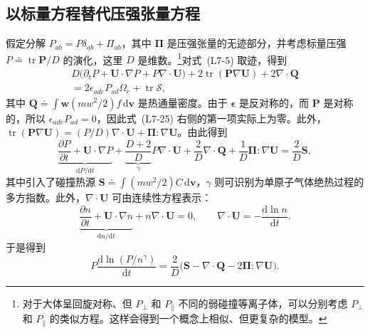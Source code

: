 \subsection{以标量方程替代压强张量方程}
假定分解 $P_{ab}=P\delta_{ab}+\Pi_{ab}$，其中 $\boldsymbol\Pi$ 是压强张量的无迹部分，并考虑标量压强 $P\doteq\operatorname{tr}\boldsymbol P/D$ 的演化，这里 $D$ 是维数。\footnote{对于大体呈回旋对称、但 $P_\perp$ 和 $P_\parallel$ 不同的弱碰撞等离子体，可以分别考虑 $P_\perp$ 和 $P_\parallel$ 的类似方程。这样会得到一个概念上相似、但更复杂的模型。}对式~(L7-5) 取迹，得到
\begin{equation}
\begin{aligned}
D\bigl(\partial_tP+\boldsymbol U\cdot\nabla P+P\nabla\cdot\boldsymbol U\bigr)
+2\operatorname{tr}(\boldsymbol P\nabla\boldsymbol U)+2\nabla\cdot\boldsymbol Q
\\{}=2\epsilon_{ade}P_{ad}\Omega_e+\operatorname{tr}\boldsymbol{\mathcal S},
\end{aligned}
\tag{L7-25}\label{eq:L7:25}
\end{equation}
其中 $\boldsymbol Q\doteq\int\boldsymbol w(mw^2/2)f\,\mathrm d\boldsymbol v$ 是热通量密度。由于 $\boldsymbol\epsilon$ 是反对称的，而 $\boldsymbol P$ 是对称的，所以 $\epsilon_{ade}P_{ad}=0$，因此式~(L7-25) 右侧的第一项实际上为零。此外，$\operatorname{tr}(\boldsymbol P\nabla\boldsymbol U)=(P/D)\nabla\cdot\boldsymbol U+\boldsymbol\Pi:\nabla\boldsymbol U$。由此得到
\begin{equation}
\underbrace{\frac{\partial P}{\partial t}+\boldsymbol U\cdot\nabla P}_{\mathrm dP/\mathrm dt}
+\underbrace{\frac{D+2}{D}}_{\gamma}P\nabla\cdot\boldsymbol U
+\frac2D\nabla\cdot\boldsymbol Q+\frac1D\boldsymbol\Pi:\nabla\boldsymbol U
=\frac2D\boldsymbol S,
\tag{L7-26}\label{eq:L7:26}
\end{equation}
其中引入了碰撞热源 $\boldsymbol S\doteq\int(mw^2/2)C\,\mathrm d\boldsymbol v$，$\gamma$ 则可识别为单原子气体绝热过程的多方指数。此外，$\nabla\cdot\boldsymbol U$ 可由连续性方程表示：
\begin{equation}
\underbrace{\frac{\partial n}{\partial t}+\boldsymbol U\cdot\nabla n}_{\mathrm dn/\mathrm dt}
+n\nabla\cdot\boldsymbol U=0,
\qquad
\nabla\cdot\boldsymbol U=-\frac{\mathrm d\ln n}{\mathrm dt}.
\tag{L7-27}\label{eq:L7:27}
\end{equation}
于是得到
\begin{equation}
P\frac{\mathrm d\ln(P/n^\gamma)}{\mathrm dt}
=\frac2D\bigl(\boldsymbol S-\nabla\cdot\boldsymbol Q-2\boldsymbol\Pi:\nabla\boldsymbol U\bigr).
\tag{L7-28}\label{eq:L7:28}
\end{equation}
